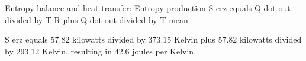 Entropy balance and heat transfer:  
Entropy production S erz equals Q dot out divided by T R plus Q dot out divided by T mean.  

S erz equals 57.82 kilowatts divided by 373.15 Kelvin plus 57.82 kilowatts divided by 293.12 Kelvin, resulting in 42.6 joules per Kelvin.